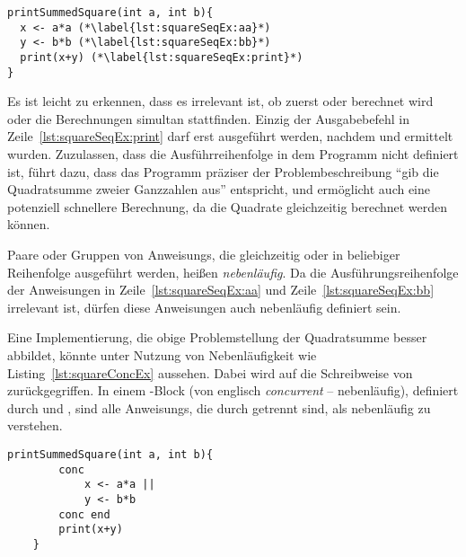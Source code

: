 \begin{lstlisting}[caption={[Beispiel eines \glsentryuseri{Programm}, das sequentiell die Summe von Quadraten zweier Ganzzahlen berechnet.]Beispiel eines \glsuseri{Programm} das die Summe von Quadraten zweier Ganzzahlen berechnet. Die Berechnung der Quadratzahlen wird nacheinander in einer fest definierten Sequenz durchgeführt.}, label={lst:squareSeqEx},float={!htbp}]
printSummedSquare(int a, int b){
  x <- a*a (*\label{lst:squareSeqEx:aa}*)
  y <- b*b (*\label{lst:squareSeqEx:bb}*)
  print(x+y) (*\label{lst:squareSeqEx:print}*)
}
\end{lstlisting}
Es ist leicht zu erkennen, dass es irrelevant ist, ob zuerst  oder  berechnet wird oder die Berechnungen simultan stattfinden. Einzig der Ausgabebefehl in Zeile~\ref{lst:squareSeqEx:print} darf erst ausgeführt werden, nachdem  und  ermittelt wurden. Zuzulassen, dass die Ausführreihenfolge in dem \gls{Programm} nicht definiert ist, führt dazu, dass das \gls{Programm} präziser der Problembeschreibung \enquote{gib die Quadratsumme zweier Ganzzahlen aus} entspricht, und ermöglicht auch eine potenziell schnellere Berechnung, da die Quadrate gleichzeitig berechnet werden können.

Paare oder Gruppen von \glspl{Anweisung}, die gleichzeitig oder in beliebiger Reihenfolge ausgeführt werden, heißen \emph{nebenläufig}. Da die Ausführungsreihenfolge der Anweisungen in Zeile~\ref{lst:squareSeqEx:aa} und Zeile~\ref{lst:squareSeqEx:bb} irrelevant ist, dürfen diese Anweisungen auch nebenläufig definiert sein.

Eine Implementierung, die obige Problemstellung der Quadratsumme besser abbildet, könnte unter Nutzung von Nebenläufigkeit wie Listing~\ref{lst:squareConcEx} aussehen. Dabei wird auf die Schreibweise von \textcite[S.~16]{Herrtwich1989} zurückgegriffen. In einem -Block (von englisch \emph{concurrent} -- nebenläufig), definiert durch  und , sind alle \glspl{Anweisung}, die durch \code{||} getrennt sind, als nebenläufig zu verstehen. 

\begin{lstlisting}[caption={[Beispiel eines \glsentryuseri{Programm} mit nebenläufigem Code in einem \code{conc}-Block.]Beispiel eines \glsuseri{Programm} mit nebenläufigem Code in einem \code{conc}-Block. Das \gls{Programm} gibt die Summe von zwei Quadratzahlen aus, wobei die Berechnung der Quadratzahlen nebenläufig stattfindet.}, label={lst:squareConcEx},float={!htbp}]
	printSummedSquare(int a, int b){
		conc 
			x <- a*a ||
			y <- b*b
		conc end
		print(x+y)
	}
\end{lstlisting}

